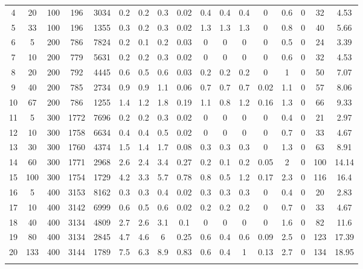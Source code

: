 \documentclass[11pt]{article}
\newcommand{\np}{\newpage}
\begin{document}
\begin{appendices}
\begin{landscape}
\begin{longtable}[c]{ccccc|cccc|cccc|cccc}
				\rowcolor[HTML]{EFEFEF} 
				4 & 20 & 100 & 196 & 3034 & 0.2 & 0.2 & 0.3 & 0.02 & 0.4 & 0.4 & 0.4 & 0 & 0.6 & 0 & 32 & 4.53 \\
				\rowcolor[HTML]{EFEFEF} 
				5 & 33 & 100 & 196 & 1355 & 0.3 & 0.2 & 0.3 & 0.02 & 1.3 & 1.3 & 1.3 & 0 & 0.8 & 0 & 40 & 5.66 \\
				6 & 5 & 200 & 786 & 7824 & 0.2 & 0.1 & 0.2 & 0.03 & 0 & 0 & 0 & 0 & 0.5 & 0 & 24 & 3.39 \\
				7 & 10 & 200 & 779 & 5631 & 0.2 & 0.2 & 0.3 & 0.02 & 0 & 0 & 0 & 0 & 0.6 & 0 & 32 & 4.53 \\
				8 & 20 & 200 & 792 & 4445 & 0.6 & 0.5 & 0.6 & 0.03 & 0.2 & 0.2 & 0.2 & 0 & 1 & 0 & 50 & 7.07 \\
				9 & 40 & 200 & 785 & 2734 & 0.9 & 0.9 & 1.1 & 0.06 & 0.7 & 0.7 & 0.7 & 0.02 & 1.1 & 0 & 57 & 8.06 \\
				10 & 67 & 200 & 786 & 1255 & 1.4 & 1.2 & 1.8 & 0.19 & 1.1 & 0.8 & 1.2 & 0.16 & 1.3 & 0 & 66 & 9.33 \\
				\rowcolor[HTML]{EFEFEF} 
				11 & 5 & 300 & 1772 & 7696 & 0.2 & 0.2 & 0.3 & 0.02 & 0 & 0 & 0 & 0 & 0.4 & 0 & 21 & 2.97 \\
				\rowcolor[HTML]{EFEFEF} 
				12 & 10 & 300 & 1758 & 6634 & 0.4 & 0.4 & 0.5 & 0.02 & 0 & 0 & 0 & 0 & 0.7 & 0 & 33 & 4.67 \\
				\rowcolor[HTML]{EFEFEF} 
				13 & 30 & 300 & 1760 & 4374 & 1.5 & 1.4 & 1.7 & 0.08 & 0.3 & 0.3 & 0.3 & 0 & 1.3 & 0 & 63 & 8.91 \\
				\rowcolor[HTML]{EFEFEF} 
				14 & 60 & 300 & 1771 & 2968 & 2.6 & 2.4 & 3.4 & 0.27 & 0.2 & 0.1 & 0.2 & 0.05 & 2 & 0 & 100 & 14.14 \\
				\rowcolor[HTML]{EFEFEF} 
				15 & 100 & 300 & 1754 & 1729 & 4.2 & 3.3 & 5.7 & 0.78 & 0.8 & 0.5 & 1.2 & 0.17 & 2.3 & 0 & 116 & 16.4 \\
				16 & 5 & 400 & 3153 & 8162 & 0.3 & 0.3 & 0.4 & 0.02 & 0.3 & 0.3 & 0.3 & 0 & 0.4 & 0 & 20 & 2.83 \\
				17 & 10 & 400 & 3142 & 6999 & 0.6 & 0.5 & 0.6 & 0.02 & 0.2 & 0.2 & 0.2 & 0 & 0.7 & 0 & 33 & 4.67 \\
				18 & 40 & 400 & 3134 & 4809 & 2.7 & 2.6 & 3.1 & 0.1 & 0 & 0 & 0 & 0 & 1.6 & 0 & 82 & 11.6 \\
				19 & 80 & 400 & 3134 & 2845 & 4.7 & 4.6 & 6 & 0.25 & 0.6 & 0.4 & 0.6 & 0.09 & 2.5 & 0 & 123 & 17.39 \\
				20 & 133 & 400 & 3144 & 1789 & 7.5 & 6.3 & 8.9 & 0.83 & 0.6 & 0.4 & 1 & 0.13 & 2.7 & 0 & 134 & 18.95 \\ \np

\end{longtable}
\end{landscape}
\end{appendices}
\end{document}
